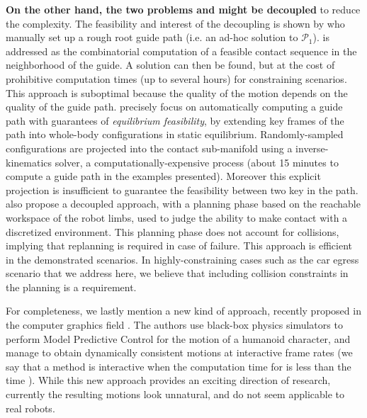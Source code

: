 \textbf{On the other hand, the two problems \Pa and \Pb might be decoupled} to reduce the complexity. The feasibility and interest of the decoupling is shown by \citeauthor{DBLP:conf/iser/EscandeKMG08} who manually set up a rough root guide path (i.e. an ad-hoc solution to $\mathcal{P}_1$). \Pb is addressed as the combinatorial computation of a feasible contact sequence in the neighborhood of the guide. A solution can then be found, %
but at the cost of prohibitive computation times (up to several hours) for constraining scenarios. This approach is suboptimal because the quality of the motion depends on the quality of the guide path. \citeauthor{Bouyarmane2009} precisely focus on automatically computing a guide path with guarantees of \textit{equilibrium feasibility}, by extending key frames of the path into whole-body configurations in static equilibrium. Randomly-sampled configurations are projected into the contact sub-manifold using a inverse-kinematics solver, a computationally-expensive process (about 15 minutes to compute a guide path in the examples presented). Moreover this explicit projection is insufficient to guarantee the feasibility between two key  in the path. \citeauthor{7140082} also propose a decoupled approach, with a planning phase based on the reachable workspace of the robot limbs, used to judge the ability to make contact with 
a discretized environment. This planning phase does not account for collisions, implying that replanning is required in case of failure. This approach is efficient 
in the demonstrated scenarios. In highly-constraining cases such 
as the car egress scenario that we address here, we believe that including collision constraints in the planning is a requirement.

For completeness, we lastly mention a new kind of approach, recently proposed in the computer graphics field \citep{hamalainen_cpbp_2015}. The authors
use black-box physics simulators to perform Model Predictive Control for the motion of a humanoid character, and manage to obtain dynamically consistent motions
at \gls{interactive} frame rates (we say that a  method is interactive when the computation time for  is less than the
time ). While this new approach provides an exciting direction of research, currently the resulting motions
look unnatural, and do not seem applicable to real robots.


